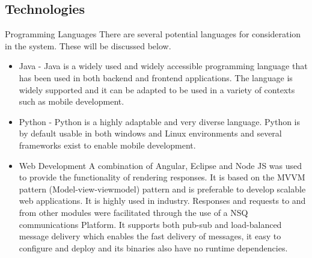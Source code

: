 \documentclass[12pt]{article}
\begin{document}
\subsection{Technologies}
Programming Languages
There are several potential languages for consideration in the system. These will be discussed below.
\begin{itemize}
\item Java - Java is a widely used and widely accessible programming language that has been used in both backend and frontend applications. The language is widely supported and it can be adapted to be used in a variety of contexts such as mobile development.
\item Python - Python is a highly adaptable and very diverse language. Python is by default usable in both windows and Linux environments and several frameworks exist to enable mobile development.
\end{itemize}
\begin{itemize}

\item Web Development
A combination of Angular, Eclipse and Node JS was used to provide the functionality of rendering responses. It is based on the MVVM pattern (Model-view-viewmodel) pattern and is preferable to develop scalable web applications. It is highly used in industry. Responses and requests to and from other modules were facilitated through the use of a NSQ communications Platform. It supports both pub-sub and load-balanced message delivery which enables the fast delivery of messages, it easy to configure and deploy and its binaries also have no runtime dependencies.



\end{itemize}
\end{document}
